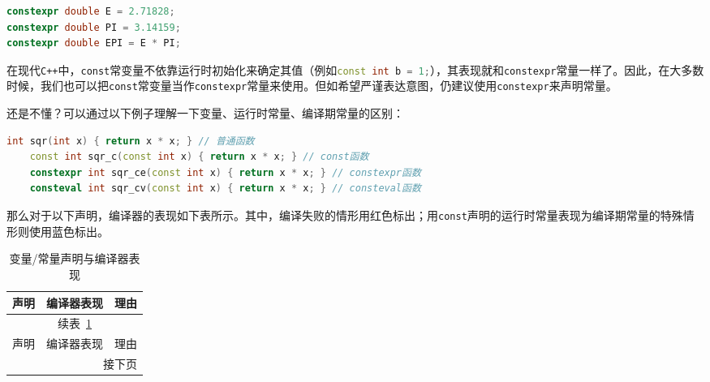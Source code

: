 \begin{lstlisting}[language=C++]
constexpr double E = 2.71828;
constexpr double PI = 3.14159;
constexpr double EPI = E * PI;
\end{lstlisting}

在现代\texttt{C++}中，\texttt{const}常变量不依靠运行时初始化来确定其值（例如\lstinline[language=c++]|const int b = 1;|），其表现就和\texttt{constexpr}常量一样了。因此，在大多数时候，我们也可以把\texttt{const}常变量当作\texttt{constexpr}常量来使用。但如希望严谨表达意图，仍建议使用\texttt{constexpr}来声明常量。

\begin{tip}
还是不懂？可以通过以下例子理解一下变量、运行时常量、编译期常量的区别：
\begin{lstlisting}[language=C++]
    int sqr(int x) { return x * x; } // 普通函数
    const int sqr_c(const int x) { return x * x; } // const函数
    constexpr int sqr_ce(const int x) { return x * x; } // constexpr函数
    consteval int sqr_cv(const int x) { return x * x; } // consteval函数
\end{lstlisting}

那么对于以下声明，编译器的表现如下表所示。其中，编译失败的情形用红色标出；用\texttt{const}声明的运行时常量表现为编译期常量的特殊情形则使用蓝色标出。
\begin{small}            %
\begin{longtable}[c]{lll}
  \caption{变量/常量声明与编译器表现}
  \label{tab:long}\\
  \toprule
  声明 & 编译器表现 & 理由 \\
  \midrule
  \endfirsthead          %

  \multicolumn{3}{c}{\footnotesize 续表~\ref{tab:long}}\\[.5ex]
  \toprule
  声明 & 编译器表现 & 理由 \\
  \midrule
  \endhead               %

  \midrule
  \multicolumn{3}{r}{\footnotesize 接下页}
  \endfoot               %

  \bottomrule
  \endlastfoot           %


\end{longtable}
\end{small}
\end{tip}
